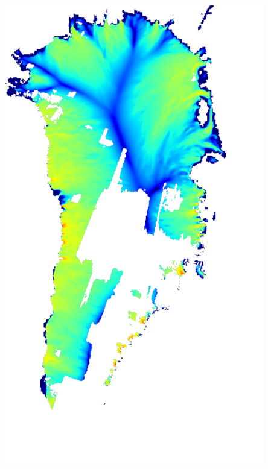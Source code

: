 \documentclass{beamer}
\begin{document}
\begin{frame}
\begin{columns}
\begin{column}{0.33\textwidth}
\begin{center}
  \includegraphics[width=0.85\textwidth]{g3km_5_25_98}
\end{center}
\end{column}
\end{columns}
\end{frame}
\end{document}
